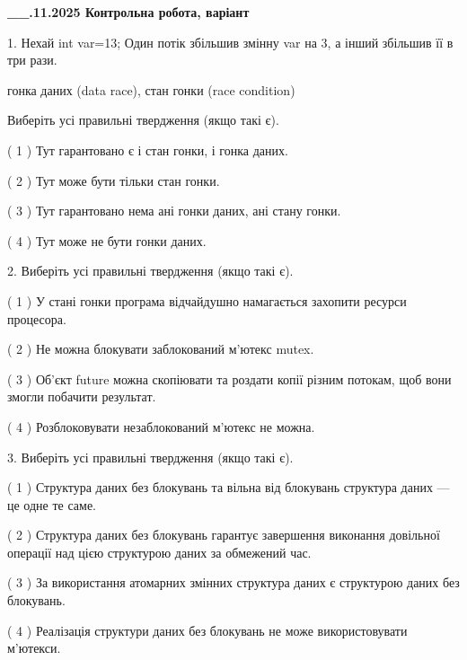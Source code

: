 \documentclass[12pt, ukrainian]{article}
\begin{document}
\newpage
\begin {large}

\textbf{\_\_.11.2025 Контрольна робота, варіант  }\par


{
1. Нехай int var=13; Один потік збільшив змінну var на 3, а інший збільшив її в три рази.

гонка даних (data race), стан гонки (race condition)

Виберіть усі правильні твердження (якщо такі є).\par
\vspace{2mm}
( 1 ) Тут гарантовано є і стан гонки, і гонка даних.%

( 2 ) Тут може бути тільки стан гонки.%

( 3 ) Тут гарантовано нема ані гонки даних, ані стану гонки.%

( 4 ) Тут може не бути гонки даних.%


2. Виберіть усі правильні твердження (якщо такі є).\par
\vspace{2mm}

( 1 ) У стані гонки програма відчайдушно намагається захопити ресурси процесора.%

( 2 ) Не можна блокувати заблокований м’ютекс mutex.%

( 3 ) Об’єкт future можна скопіювати та роздати копії різним потокам, щоб вони змогли побачити результат.%

( 4 ) Розблоковувати незаблокований м’ютекс не можна.%


3. Виберіть усі правильні твердження (якщо такі є).\par
\vspace{2mm}

( 1 ) Структура даних без блокувань та вільна від блокувань структура даних --- це одне те саме.%

( 2 ) Структура даних без блокувань гарантує завершення виконання довільної операції над цією структурою даних за обмежений час.%

( 3 ) За використання атомарних змінних структура даних є структурою даних без блокувань.%

( 4 ) Реалізація структури даних без блокувань не може використовувати м’ютекси.%


}
\end{large}
\end{document}
